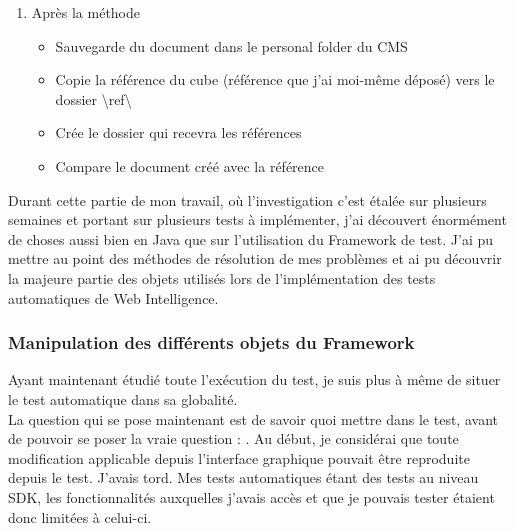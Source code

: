 \begin{enumerate}
\begin{itemize}
	\end{itemize}
	\item Apr\`{e}s la m\'{e}thode 
	\begin{itemize}
		\item Sauvegarde du document dans le personal folder du \gls{CMS}
		\item Copie la r\'{e}f\'{e}rence du cube (r\'{e}f\'{e}rence que j'ai moi-m\^{e}me d\'{e}pos\'{e}) vers le dossier \textbackslash ref\textbackslash
		\item Cr\'{e}e le dossier qui recevra les r\'{e}f\'{e}rences
		\item Compare le document cr\'{e}\'{e} avec la r\'{e}f\'{e}rence
	\end{itemize}
\end{enumerate}

Durant cette partie de mon travail, o\`{u} l'investigation c'est \'{e}tal\'{e}e sur plusieurs semaines et portant sur plusieurs tests \`{a} impl\'{e}menter, j'ai d\'{e}couvert \'{e}norm\'{e}ment de choses aussi bien en Java que sur l'utilisation du Framework de test. J'ai pu mettre au point des m\'{e}thodes de r\'{e}solution de mes probl\`{e}mes et ai pu d\'{e}couvrir la majeure partie des objets utilis\'{e}s lors de l'impl\'{e}mentation des tests automatiques de Web Intelligence.


\subsubsection{Manipulation des diff\'{e}rents objets du Framework}

Ayant maintenant \'{e}tudi\'{e} toute l'ex\'{e}cution du test, je suis plus \`{a} m\^{e}me de situer le test automatique dans sa globalit\'{e}.\\
La question qui se pose maintenant est de savoir quoi mettre dans le test, avant de pouvoir se poser la vraie question : . Au d\'{e}but, je consid\'{e}rai que toute modification applicable depuis l'interface graphique pouvait \^{e}tre reproduite depuis le test. J'avais tord. Mes tests automatiques \'{e}tant des tests au niveau SDK, les fonctionnalit\'{e}s auxquelles j'avais acc\`{e}s et que je pouvais tester \'{e}taient donc limit\'{e}es \`{a} celui-ci.\\

